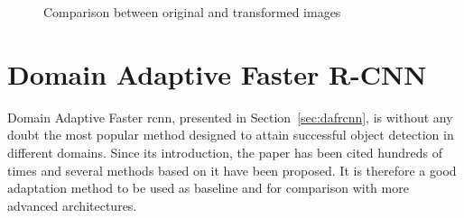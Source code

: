 \documentclass[%
    corpo=12pt,
    twoside,
    stile=classica,   
    tipotesi=magistrale,
    evenboxes,
    english
]{toptesi}
\begin{document}
\begin{figure}[ht]
	\centering
	\caption{Comparison between original and transformed images}
	\label{fig:augs}
\end{figure}


\section{Domain Adaptive Faster R-CNN}
Domain Adaptive Faster \acrshort{rcnn}\cite{chen2018domain}, presented in Section~\ref{sec:dafrcnn}, is without any doubt the most popular method designed to attain successful object detection in different domains. Since its introduction, the paper has been cited hundreds of times and several methods based on it have been proposed. It is therefore a good adaptation method to be used as baseline and for comparison with more advanced architectures.
\end{document}
